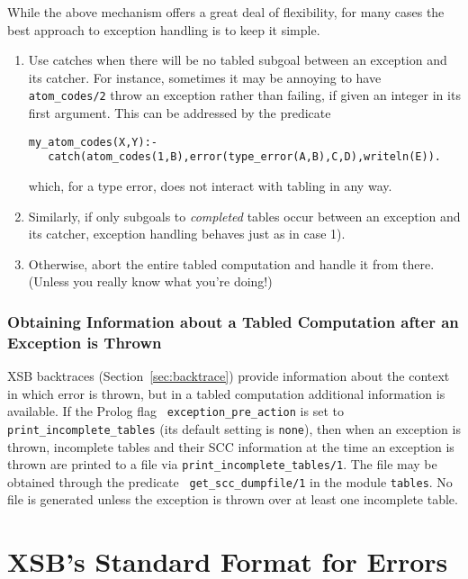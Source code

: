 While the above mechanism offers a great deal of flexibility, for many
cases the best approach to exception handling is to keep it simple.
%
\begin{enumerate}
\item Use catches when there will be no tabled subgoal between an
  exception and its catcher.  For instance, sometimes it may be
  annoying to have {\tt atom\_codes/2} throw an exception rather than
  failing, if given an integer in its first argument.  This can be
  addressed by the predicate
%
\begin{verbatim}
my_atom_codes(X,Y):- 
   catch(atom_codes(1,B),error(type_error(A,B),C,D),writeln(E)).
\end{verbatim}
%
which, for a type error, does not interact with tabling in any way.  
%
\item Similarly, if only subgoals to {\em completed} tables occur
  between an exception and its catcher, exception handling behaves
  just as in case 1).
%
\item Otherwise, abort the entire tabled computation and handle it
  from there.  (Unless you really know what you're doing!)
\end{enumerate}
%

\subsubsection{Obtaining Information about a Tabled Computation after an Exception is Thrown}
%
XSB backtraces (Section~\ref{sec:backtrace}) provide information about
the context in which error is thrown, but in a tabled computation
additional information is available.  If the Prolog flag {\tt
  exception\_pre\_action} is set to {\tt print\_incomplete\_tables}
(its default setting is {\tt none}), then when an exception is thrown,
incomplete tables and their SCC information at the time an exception
is thrown are printed to a file via {\tt print\_incomplete\_tables/1}.
The file may be obtained through the predicate {\tt
  get\_scc\_dumpfile/1} in the module {\tt tables}.  No file is
generated unless the exception is thrown over at least one incomplete
table.

\section{XSB's Standard Format for Errors} \label{sec:iso-errors}

